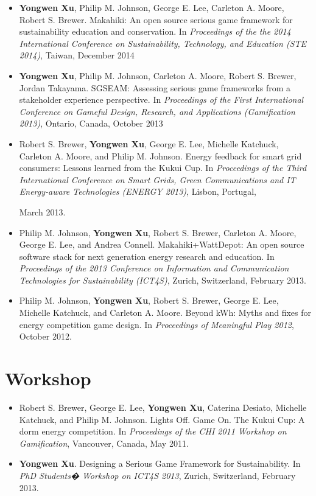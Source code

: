 \begin{itemize}

\item \textbf{Yongwen Xu}, Philip M. Johnson, George E. Lee, Carleton A. Moore, Robert S. Brewer. Makahiki: An open source serious game framework for sustainability education and conservation.   
In \emph{Proceedings of the the 2014 International Conference on Sustainability, Technology, and Education (STE 2014)}, Taiwan, December 2014
 	
\item \textbf{Yongwen Xu}, Philip M. Johnson, Carleton A. Moore, Robert S. Brewer, Jordan Takayama. SGSEAM: Assessing serious game frameworks from a stakeholder experience perspective.   
In \emph{Proceedings of the First International Conference on Gameful Design, Research, and Applications (Gamification 2013)}, Ontario, Canada, October 2013

\item Robert S. Brewer, \textbf{Yongwen Xu}, George E. Lee, Michelle Katchuck, Carleton A. Moore, and Philip M. Johnson. Energy feedback for smart grid consumers: Lessons learned from the Kukui Cup. In \emph{Proceedings of the Third International Conference on Smart Grids, Green Communications and IT Energy-aware Technologies (ENERGY 2013)}, Lisbon, Portugal, 

March 2013.

\item Philip M. Johnson, \textbf{Yongwen Xu}, Robert S. Brewer, Carleton A. Moore, George E. Lee, and Andrea Connell. Makahiki+WattDepot: An open source software stack for next generation energy research and education. In \emph{Proceedings of the 2013 Conference on Information and Communication Technologies for Sustainability (ICT4S)}, Zurich, Switzerland, February 2013.

\item Philip M. Johnson, \textbf{Yongwen Xu}, Robert S. Brewer, George E. Lee, Michelle Katchuck, and Carleton A. Moore. Beyond kWh: Myths and fixes for energy competition game design. In \emph{Proceedings of Meaningful Play 2012}, October 2012.

\end{itemize}


\section{Workshop}

\begin{itemize}

\item Robert S. Brewer, George E. Lee, \textbf{Yongwen Xu}, Caterina Desiato, Michelle Katchuck, and Philip M. Johnson. Lights Off. Game On. The Kukui Cup: A dorm energy competition. In \emph{Proceedings of the CHI 2011 Workshop on Gamification}, Vancouver, Canada, May 2011.

\item \textbf{Yongwen Xu}. Designing a Serious Game Framework for Sustainability. In \emph{PhD Students�  Workshop on ICT4S 2013}, Zurich, Switzerland, February 2013.

\end{itemize}

